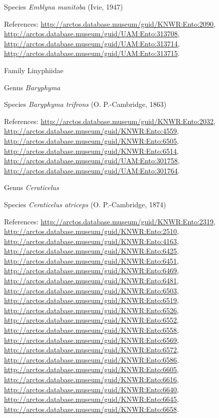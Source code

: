 \documentclass[9pt, article]{memoir}
\begin{document}
\begin{multicols}{2}
\vspace{6pt}\noindent\hspace{36pt}Species \textit{Emblyna manitoba} (Ivie, 1947)


\vspace{6pt}References: 
\url{http://arctos.database.museum/guid/KNWR:Ento:2090}, 
\url{http://arctos.database.museum/guid/UAM:Ento:313708}, 
\url{http://arctos.database.museum/guid/UAM:Ento:313714}, 
\url{http://arctos.database.museum/guid/UAM:Ento:313715}.

\vspace{6pt}\noindent\hspace{24pt}Family Linyphiidae


\vspace{6pt}\noindent\hspace{30pt}Genus \textit{Baryphyma}


\vspace{6pt}\noindent\hspace{36pt}Species \textit{Baryphyma trifrons} (O. P.-Cambridge, 1863)


\vspace{6pt}References: 
\url{http://arctos.database.museum/guid/KNWR:Ento:2032}, 
\url{http://arctos.database.museum/guid/KNWR:Ento:4559}, 
\url{http://arctos.database.museum/guid/KNWR:Ento:6505}, 
\url{http://arctos.database.museum/guid/KNWR:Ento:6514}, 
\url{http://arctos.database.museum/guid/UAM:Ento:301758}, 
\url{http://arctos.database.museum/guid/UAM:Ento:301764}.

\vspace{6pt}\noindent\hspace{30pt}Genus \textit{Ceraticelus}


\vspace{6pt}\noindent\hspace{36pt}Species \textit{Ceraticelus atriceps} (O. P.-Cambridge, 1874)


\vspace{6pt}References: 
\url{http://arctos.database.museum/guid/KNWR:Ento:2319}, 
\url{http://arctos.database.museum/guid/KNWR:Ento:2510}, 
\url{http://arctos.database.museum/guid/KNWR:Ento:4163}, 
\url{http://arctos.database.museum/guid/KNWR:Ento:6425}, 
\url{http://arctos.database.museum/guid/KNWR:Ento:6451}, 
\url{http://arctos.database.museum/guid/KNWR:Ento:6469}, 
\url{http://arctos.database.museum/guid/KNWR:Ento:6481}, 
\url{http://arctos.database.museum/guid/KNWR:Ento:6503}, 
\url{http://arctos.database.museum/guid/KNWR:Ento:6519}, 
\url{http://arctos.database.museum/guid/KNWR:Ento:6526}, 
\url{http://arctos.database.museum/guid/KNWR:Ento:6552}, 
\url{http://arctos.database.museum/guid/KNWR:Ento:6558}, 
\url{http://arctos.database.museum/guid/KNWR:Ento:6569}, 
\url{http://arctos.database.museum/guid/KNWR:Ento:6572}, 
\url{http://arctos.database.museum/guid/KNWR:Ento:6586}, 
\url{http://arctos.database.museum/guid/KNWR:Ento:6605}, 
\url{http://arctos.database.museum/guid/KNWR:Ento:6616}, 
\url{http://arctos.database.museum/guid/KNWR:Ento:6640}, 
\url{http://arctos.database.museum/guid/KNWR:Ento:6645}, 
\url{http://arctos.database.museum/guid/KNWR:Ento:6658}.


\end{multicols}
\end{document}
